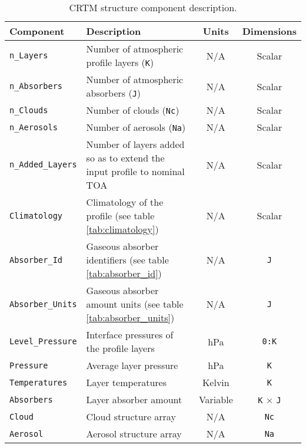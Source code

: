 \begin{table}[htp]
  \centering
  \begin{tabular}{|l|p{7cm}|c|c|}
    \hline
    \sffamily\textbf{Component} & \sffamily\textbf{Description} & \sffamily\textbf{Units} & \sffamily\textbf{Dimensions} \\
    \hline\hline
    \texttt{n\_Layers} & Number of atmospheric profile layers (\texttt{K}) & N/A & Scalar \\
    \texttt{n\_Absorbers} & Number of atmospheric absorbers (\texttt{J}) & N/A & Scalar \\
    \texttt{n\_Clouds} & Number of clouds (\texttt{Nc}) & N/A & Scalar \\
    \texttt{n\_Aerosols} & Number of aerosols (\texttt{Na}) & N/A & Scalar \\
    \texttt{n\_Added\_Layers} & Number of layers added so as to extend the input profile to nominal TOA  & N/A & Scalar \\
    \texttt{Climatology} & Climatology of the profile (see table \ref{tab:climatology}) & N/A & Scalar \\
    \texttt{Absorber\_Id} & Gaseous absorber identifiers (see table \ref{tab:absorber_id}) & N/A & \texttt{J}\\
    \texttt{Absorber\_Units} & Gaseous absorber amount units (see table \ref{tab:absorber_units}) & N/A & \texttt{J}\\
    \texttt{Level\_Pressure} & Interface pressures of the profile layers & hPa & \texttt{0:K} \\
    \texttt{Pressure} & Average layer pressure & hPa & \texttt{K} \\
    \texttt{Temperatures} & Layer temperatures & Kelvin & \texttt{K} \\
    \texttt{Absorbers} & Layer absorber amount & Variable & \texttt{K} $\times$ \texttt{J}\\
    \texttt{Cloud} & Cloud structure array & N/A & \texttt{Nc}\\
    \texttt{Aerosol} & Aerosol structure array & N/A & \texttt{Na}\\
    \hline
  \end{tabular}
  \caption{CRTM \Atmosphere{} structure component description.}
  \label{tab:atmosphere_structure}
\end{table}

